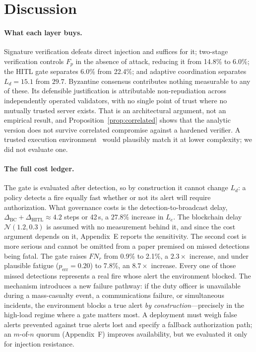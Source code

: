 \documentclass[letterpaper]{article} %
\newcommand{\Le}{L_e}
\newcommand{\appSensitivity}{E}
\newcommand{\appMultisig}{F}
\begin{document}
\section{Discussion}
\label{sec:discussion}

\paragraph{What each layer buys.} Signature verification defeats direct injection and suffices for it; two-stage verification controls $F_p$ in the absence of attack, reducing it from 14.8\% to 6.0\%; the HITL gate separates 6.0\% from 22.4\%; and adaptive coordination separates $L_d=15.1$ from $29.7$. Byzantine consensus contributes nothing measurable to any of these. Its defensible justification is attributable non-repudiation across independently operated validators, with no single point of trust where no mutually trusted server exists. That is an architectural argument, not an empirical result, and Proposition~\ref{prop:correlated} shows that the analytic version does not survive correlated compromise against a hardened verifier. A trusted execution environment~\citep{costan2016} would plausibly match it at lower complexity; we did not evaluate one.

\paragraph{The full cost ledger.} The gate is evaluated after detection, so by construction it cannot change $L_d$: a policy detects a fire equally fast whether or not its alert will require authorization. What governance costs is the detection-to-broadcast delay, $\Delta_{\mathrm{BC}}+\Delta_{\mathrm{HITL}}\approx 4.2$ steps or 42\,s, a $27.8\%$ increase in $\Le$. The blockchain delay $\mathcal{N}(1.2,0.3)$ is assumed with no measurement behind it, and since the cost argument depends on it, Appendix~\appSensitivity{} reports the sensitivity. The second cost is more serious and cannot be omitted from a paper premised on missed detections being fatal. The gate raises $FN_r$ from 0.9\% to 2.1\%, a $2.3\times$ increase, and under plausible fatigue ($p_{\mathrm{err}}=0.20$) to 7.8\%, an $8.7\times$ increase. Every one of those missed detections represents a real fire whose alert the environment blocked. The mechanism introduces a new failure pathway: if the duty officer is unavailable during a mass-casualty event, a communications failure, or simultaneous incidents, the environment blocks a true alert \emph{by construction}---precisely in the high-load regime where a gate matters most. A deployment must weigh false alerts prevented against true alerts lost and specify a fallback authorization path; an $m$-of-$n$ quorum (Appendix~\appMultisig) improves availability, but we evaluated it only for injection resistance.
\end{document}

